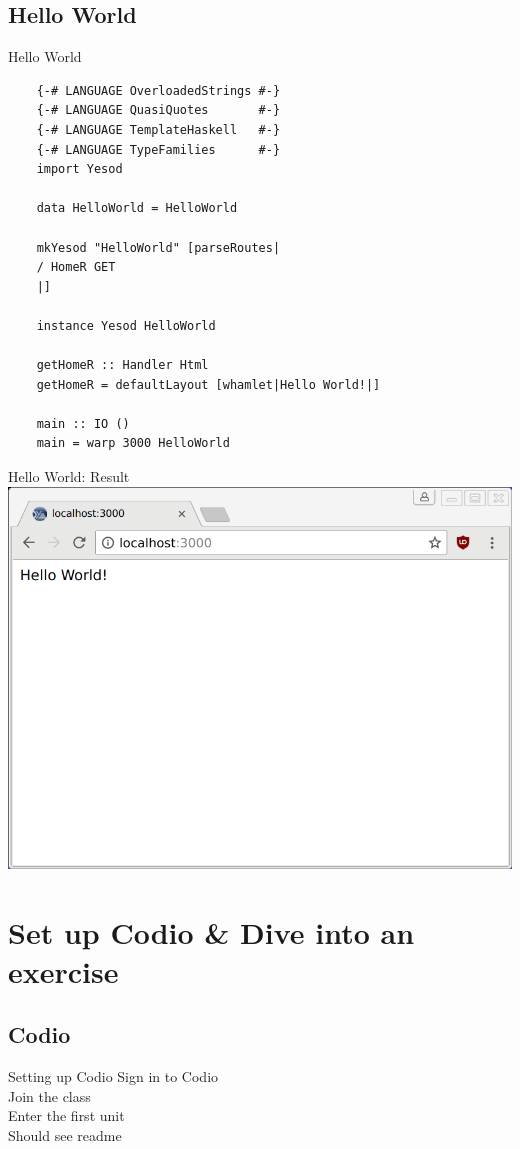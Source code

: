 \documentclass[pdf]{beamer}
\begin{document}
\subsection{Hello World}
\begin{frame}[fragile]{Hello World}
  \begin{verbatim}
    {-# LANGUAGE OverloadedStrings #-}
    {-# LANGUAGE QuasiQuotes       #-}
    {-# LANGUAGE TemplateHaskell   #-}
    {-# LANGUAGE TypeFamilies      #-}
    import Yesod

    data HelloWorld = HelloWorld

    mkYesod "HelloWorld" [parseRoutes|
    / HomeR GET
    |]

    instance Yesod HelloWorld

    getHomeR :: Handler Html
    getHomeR = defaultLayout [whamlet|Hello World!|]

    main :: IO ()
    main = warp 3000 HelloWorld
  \end{verbatim}
\end{frame}

\begin{frame}{Hello World: Result}
  \includegraphics[width=\textwidth,height=0.8\textheight,keepaspectratio]{example}
\end{frame}

\section{Set up Codio \& Dive into an exercise}

\subsection{Codio}
\begin{frame}{Setting up Codio}
  Sign in to Codio \\

  Join the class \\

  Enter the first unit \\

  Should see readme \\
\end{frame}
\end{document}
